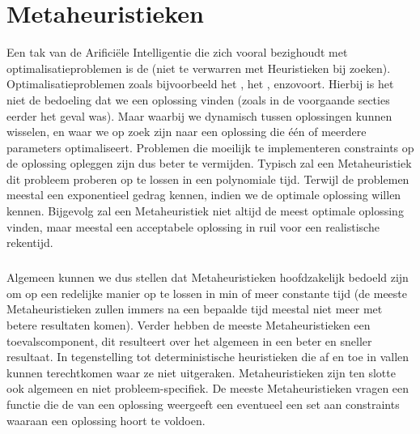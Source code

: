 \chapter{Metaheuristieken}
\label{s:metaheuristics}
Een tak van de Arifici\"ele Intelligentie die zich vooral bezighoudt met optimalisatieproblemen is de  (niet te verwarren met Heuristieken bij zoeken). Optimalisatieproblemen zoals bijvoorbeeld het , het , enzovoort. Hierbij is het niet de bedoeling dat we een oplossing vinden (zoals in de voorgaande secties eerder het geval was). Maar waarbij we dynamisch tussen oplossingen kunnen wisselen, en waar we op zoek zijn naar een oplossing die \'e\'en of meerdere parameters optimaliseert. Problemen die moeilijk te implementeren constraints op de oplossing opleggen zijn dus beter te vermijden. Typisch  zal een Metaheuristiek dit probleem proberen op te lossen in een polynomiale tijd. Terwijl de problemen meestal een exponentieel gedrag kennen, indien we de optimale oplossing willen kennen. Bijgevolg zal een Metaheuristiek niet altijd de meest optimale oplossing vinden, maar meestal een acceptabele oplossing in ruil voor een realistische rekentijd.
\paragraph{}
Algemeen kunnen we dus stellen dat Metaheuristieken hoofdzakelijk bedoeld zijn om  op een redelijke manier op te lossen in min of meer constante tijd (de meeste Metaheuristieken zullen immers na een bepaalde tijd meestal niet meer met betere resultaten komen). Verder hebben de meeste Metaheuristieken een toevalscomponent, dit  resulteert over het algemeen in een beter en sneller resultaat. In tegenstelling tot deterministische heuristieken die af en toe in vallen kunnen terechtkomen waar ze niet uitgeraken. Metaheuristieken zijn ten slotte ook algemeen en niet probleem-specifiek. De meeste Metaheuristieken vragen een functie die de  van een oplossing weergeeft een eventueel een set aan constraints waaraan een oplossing hoort te voldoen.

